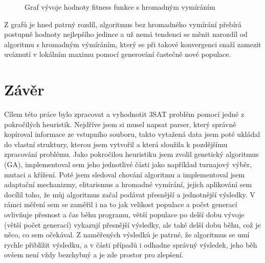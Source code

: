 \documentclass{article}
\begin{document}
    \begin{figure}[H]
        \begin{center}
            \caption{Graf vývoje hodnoty fitness funkce s hromadným vymíráním}
        \end{center}
    \end{figure}

    Z grafů je hned patrný rozdíl, algoritmus bez hromadného vymírání přebírá postupně hodnoty nejlepšího jedince a už nemá tendenci se měnit
    narozdíl od algoritmu s hromadným výmíráním, který se při takové konvergenci snaží zamezit uváznutí v lokálním maximu pomocí generování častečně nové populace.

    \pagebreak

    \section{Závěr}

    Cílem této práce bylo zpracovat a vyhodnotit 3SAT problém pomocí jedné z pokročilých heuristik.
    Nejdříve jsem si musel napsat parser, který správně kopíroval informace ze vstupního souboru, takto vytažená data jsem poté ukládal do vlastní struktury, kterou jsem vytvořil
    a která sloužila k pozdějšímu zpracování problému.
    Jako pokročilou heuristiku jsem zvolil genetický algoritmus (GA), implementoval sem jeho jednotlivé části jako například turnajový výběr, mutaci a křížení. Poté jsem sledoval chování algoritmu
    a implementoval jsem adaptační mechanizmy, elitarismus a hromadné vymírání, jejich aplikování sem docílil toho, že můj algoritmus začal podávat přesnější a jednotnější výsledky.
    V rámci měření sem se zaměřil i na to jak velikost populace a počet generací ovlivňuje přesnost a čas běhu programu, větší populace po delší dobu vývoje (větší počet generací) vykazují
    přesnější výsledky, ale také delší dobu běhu, což je něco, co sem očekával.
    Z naměřených výsledků je patrné, že algoritmus se umí rychle přiblížit výsledku, a v části případů i odhadne správný výsledek, jeho běh ovšem není vždy bezchybný a je zde prostor pro zlepšení.
\end{document}
